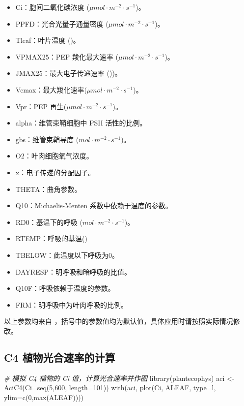 \documentclass[
]{krantz}
\makeatletter
\newenvironment{Shaded}{\begin{snugshade}}{\end{snugshade}}
\newcommand{\AttributeTok}[1]{\textcolor[rgb]{0.77,0.63,0.00}{#1}}
\newcommand{\CommentTok}[1]{\textcolor[rgb]{0.56,0.35,0.01}{\textit{#1}}}
\newcommand{\DecValTok}[1]{\textcolor[rgb]{0.00,0.00,0.81}{#1}}
\newcommand{\FunctionTok}[1]{\textcolor[rgb]{0.00,0.00,0.00}{#1}}
\newcommand{\NormalTok}[1]{#1}
\newcommand{\OtherTok}[1]{\textcolor[rgb]{0.56,0.35,0.01}{#1}}
\newcommand{\StringTok}[1]{\textcolor[rgb]{0.31,0.60,0.02}{#1}}
\providecommand{\tightlist}{%
  \setlength{\itemsep}{0pt}\setlength{\parskip}{0pt}}
\newenvironment{kframe}{%
\medskip{}
\setlength{\fboxsep}{.8em}
 \def\at@end@of@kframe{}%
 \ifinner\ifhmode%
  \def\at@end@of@kframe{\end{minipage}}%
  \begin{minipage}{\columnwidth}%
 \fi\fi%
 \def\FrameCommand##1{\hskip\@totalleftmargin \hskip-\fboxsep
 \colorbox{shadecolor}{##1}\hskip-\fboxsep
     \hskip-\linewidth \hskip-\@totalleftmargin \hskip\columnwidth}%
 \MakeFramed {\advance\hsize-\width
   \@totalleftmargin\z@ \linewidth\hsize
   \@setminipage}}%
 {\par\unskip\endMakeFramed%
 \at@end@of@kframe}
\renewenvironment{Shaded}{\begin{kframe}}{\end{kframe}}
\makeatother
\begin{document}
\begin{itemize}
\tightlist
\item
  Ci：胞间二氧化碳浓度 (\(\mu mol\cdot m^{-2}\cdot s^{-1}\))。
\item
  PPFD：光合光量子通量密度 (\(\mu mol\cdot m^{-2}\cdot s^{-1}\))。
\item
  Tleaf：叶片温度 (\textcelsius)。
\item
  VPMAX25：PEP 羧化最大速率 (\(\mu mol\cdot m^{-2}\cdot s^{-1}\))。
\item
  JMAX25：最大电子传递速率 (\textcelsius))。
\item
  Vcmax：最大羧化速率(\(\mu mol\cdot m^{-2}\cdot s^{-1}\))。
\item
  Vpr：PEP 再生(\(\mu mol\cdot m^{-2}\cdot s^{-1}\))。
\item
  alpha：维管束鞘细胞中 PSII 活性的比例。
\item
  gbs：维管束鞘导度 (\(mol\cdot m^{-2}\cdot s^{-1}\))。
\item
  O2：叶肉细胞氧气浓度。
\item
  x：电子传递的分配因子。
\item
  THETA：曲角参数。
\item
  Q10：Michaelis-Menten 系数中依赖于温度的参数。
\item
  RD0：基温下的呼吸 (\(mol\cdot m^{-2}\cdot s^{-1}\))。
\item
  RTEMP：呼吸的基温(\textcelsius)
\item
  TBELOW：此温度以下呼吸为0。
\item
  DAYRESP：明呼吸和暗呼吸的比值。
\item
  Q10F：呼吸依赖于温度的参数。
\item
  FRM：明呼吸中为叶肉呼吸的比例。
\end{itemize}

以上参数均来自 \citet{Caemmerer2000Biochemical}，括号中的参数值均为默认值，具体应用时请按照实际情况修改。

\hypertarget{c4_sim}{%
\subsection{C4 植物光合速率的计算}\label{c4_sim}}

\begin{Shaded}
\begin{Highlighting}[]
\CommentTok{\# 模拟 C4 植物的 Ci 值，计算光合速率并作图}
\FunctionTok{library}\NormalTok{(plantecophys)}
\NormalTok{aci }\OtherTok{\textless{}{-}} \FunctionTok{AciC4}\NormalTok{(}\AttributeTok{Ci=}\FunctionTok{seq}\NormalTok{(}\DecValTok{5}\NormalTok{,}\DecValTok{600}\NormalTok{, }\AttributeTok{length=}\DecValTok{101}\NormalTok{))}
\FunctionTok{with}\NormalTok{(aci, }\FunctionTok{plot}\NormalTok{(Ci, ALEAF, }\AttributeTok{type=}\StringTok{\textquotesingle{}l\textquotesingle{}}\NormalTok{, }\AttributeTok{ylim=}\FunctionTok{c}\NormalTok{(}\DecValTok{0}\NormalTok{,}\FunctionTok{max}\NormalTok{(ALEAF))))}
\end{Highlighting}
\end{Shaded}
\end{document}
